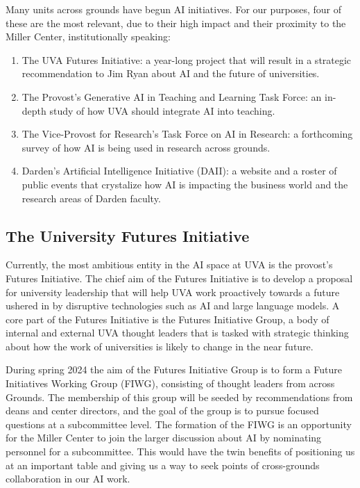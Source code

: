 \documentclass[12pt, oneside]{article}   	%
\begin{document}
Many units across grounds have begun AI initiatives.  For our purposes, four of these are the most relevant, due to their high impact and their proximity to the Miller Center, institutionally speaking:
\begin{enumerate}
\item The UVA Futures Initiative: a year-long project that will result in a strategic recommendation to Jim Ryan about AI and the future of universities.
\item The Provost's Generative AI in Teaching and Learning Task Force: an in-depth study of how UVA should integrate AI into teaching.
\item The Vice-Provost for Research's Task Force on AI in Research: a forthcoming survey of how AI is being used in research across grounds.
\item Darden's Artificial Intelligence Initiative (DAII): a website and a roster of public events that crystalize how AI is impacting the business world and the research areas of Darden faculty. 
\end{enumerate}

\subsection{The University Futures Initiative}
Currently, the most ambitious entity in the AI space at UVA is the provost’s Futures Initiative.  The chief aim of the Futures Initiative is to develop a proposal for university leadership that will help UVA work proactively towards a future ushered in by disruptive technologies such as AI and large language models.  A core part of the Futures Initiative is the Futures Initiative Group, a body of internal and external UVA thought leaders that is tasked with strategic thinking about how the work of universities is likely to change in the near future.  

During spring 2024 the aim of the Futures Initiative Group is to form a Future Initiatives Working Group (FIWG), consisting of thought leaders from across Grounds.  The membership of this group will be seeded by recommendations from deans and center directors, and the goal of the group is to pursue focused questions at a subcommittee level.  The formation of the FIWG is an opportunity for the Miller Center to join the larger discussion about AI by nominating personnel for a subcommittee.  This would have the twin benefits of positioning us at an important table and giving us a way to seek points of cross-grounds collaboration in our AI work.
\end{document}
